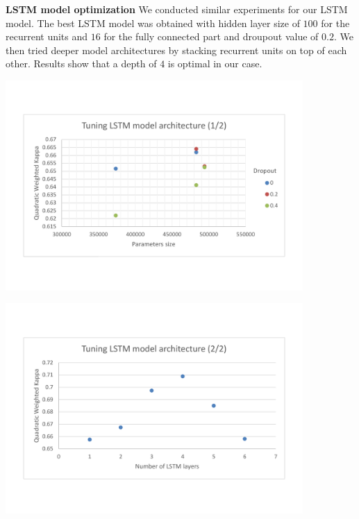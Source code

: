 \documentclass[a4paper,12pt,english]{article}
\begin{document}
\textbf{LSTM model optimization} We conducted similar experiments for our LSTM model. The best LSTM model was obtained with hidden layer size of $100$ for the recurrent units and $16$ for the fully connected part and droupout value of $0.2$. We then tried deeper model architectures by stacking recurrent units on top of each other. Results show that a depth of $4$ is optimal in our case.

\begin{center}
\vspace*{-1.5cm}
\includegraphics[width=0.85\textwidth]{fig/tune_lstm_arch_1.pdf}
\vspace*{-1.5cm}
\end{center}

\begin{center}
\vspace*{-1.5cm}
\includegraphics[width=0.85\textwidth]{fig/tune_lstm_arch_2.pdf}
\vspace*{-1.5cm}
\end{center}
\end{document}
